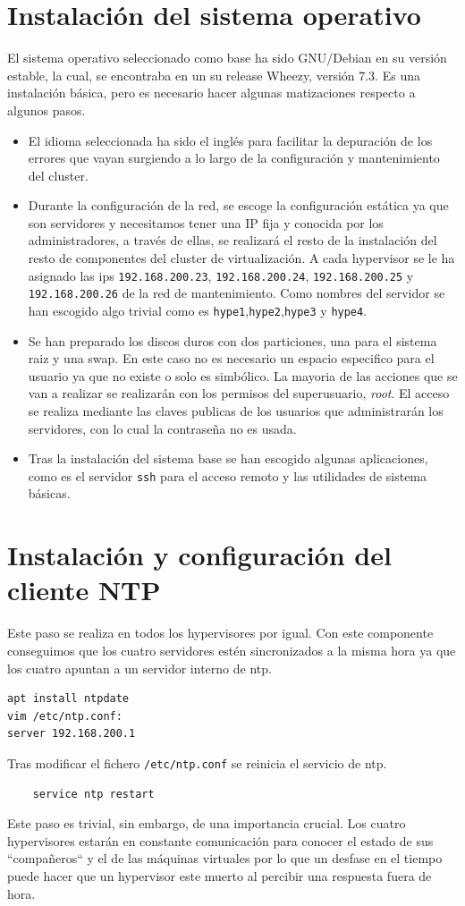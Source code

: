 \documentclass[12pt,a4paper,titlepage,twoside]{report}
\begin{document}
\section{Instalación del sistema operativo}
El sistema operativo seleccionado como base ha sido GNU/Debian en su versión estable, la cual, se encontraba en un su release Wheezy, versión 7.3. Es una instalación básica, pero es necesario hacer algunas matizaciones respecto a algunos pasos.
\begin{itemize}
	\item El idioma seleccionada ha sido el inglés para facilitar la depuración de los errores que vayan surgiendo a lo largo de la configuración y mantenimiento del cluster.
	\item Durante la configuración de la red, se escoge la configuración estática ya que son servidores y necesitamos tener una IP fija y conocida por los administradores, a través de ellas, se realizará el resto de la instalación del resto de componentes del cluster de virtualización. A cada hypervisor se le ha asignado las ips \verb|192.168.200.23|, \verb|192.168.200.24|, \verb|192.168.200.25| y \verb|192.168.200.26| de la red de mantenimiento. Como nombres del servidor se han escogido algo trivial como es \verb|hype1|,\verb|hype2|,\verb|hype3| y \verb|hype4|.
	\item Se han preparado los discos duros con dos particiones, una para el sistema raiz y una swap. En este caso no es necesario un espacio especifico para el usuario ya que no existe o solo es simbólico. La mayoria de las acciones que se van a realizar se realizarán con los permisos del superusuario, \textit{root}. El acceso se realiza mediante las claves publicas de los usuarios que administrarán los servidores, con lo cual la contraseña no es usada.
	\item Tras la instalación del sistema base se han escogido algunas aplicaciones, como es el servidor \verb|ssh| para el acceso remoto y las utilidades de sistema básicas.
\end{itemize}
\section{Instalación y configuración del cliente NTP}
Este paso se realiza en todos los hypervisores por igual. Con este componente conseguimos que los cuatro servidores estén sincronizados a la misma hora ya que los cuatro apuntan a un servidor interno de ntp.
\begin{verbatim}
apt install ntpdate
vim /etc/ntp.conf:
server 192.168.200.1
\end{verbatim}
\par Tras modificar el fichero \verb|/etc/ntp.conf| se reinicia el servicio de ntp.
\begin{verbatim}
	service ntp restart
\end{verbatim}
\par Este paso es trivial, sin embargo, de una importancia crucial. Los cuatro hypervisores estarán en constante comunicación para conocer el estado de sus ``compañeros`` y el de las máquinas virtuales por lo que un desfase en el tiempo puede hacer que un hypervisor este muerto al percibir una respuesta fuera de hora.
\end{document}
